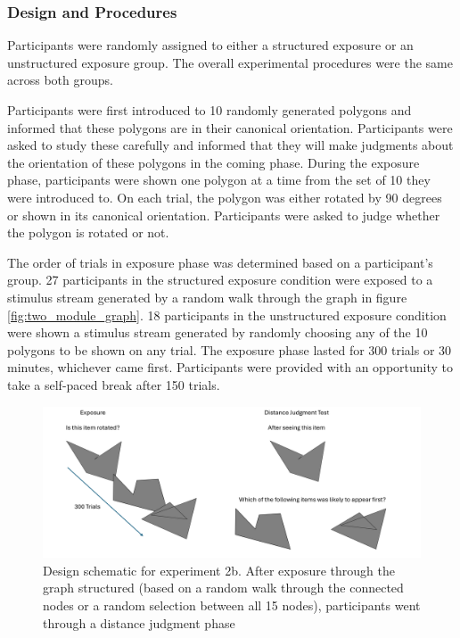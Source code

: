 \subsubsection*{Design and Procedures}
Participants were randomly assigned to either a structured exposure or an unstructured exposure group. The overall experimental procedures were the same across both groups. 

Participants were first introduced to 10 randomly generated polygons and informed that these polygons are in their canonical orientation. Participants were asked to study these carefully and informed that they will make judgments about the orientation of these polygons in the coming phase. During the exposure phase, participants were shown one polygon at a time from the set of 10 they were introduced to. On each trial, the polygon was either rotated by 90 degrees or shown in its canonical orientation. Participants were asked to judge whether the polygon is rotated or not. 

The order of trials in exposure phase was determined based on a participant's group. 27 participants in the structured exposure condition were exposed to a stimulus stream generated by a random walk through the graph in figure \ref{fig:two_module_graph}. 18 participants in the unstructured exposure condition were shown a stimulus stream generated by randomly choosing any of the 10 polygons to be shown on any trial. The exposure phase lasted for 300 trials or 30 minutes, whichever came first. Participants were provided with an opportunity to take a self-paced break after 150 trials. 

\begin{figure}
    \centering
    \includegraphics[width = \textwidth]{chapter_notebooks/chapter_3/figures/exp3_design.png}
    \caption{Design schematic for experiment 2b. After exposure through the graph structured (based on a random walk through the connected nodes or a random selection between all 15 nodes), participants went through a distance judgment phase}
    \label{fig:exp3-design}
\end{figure}


